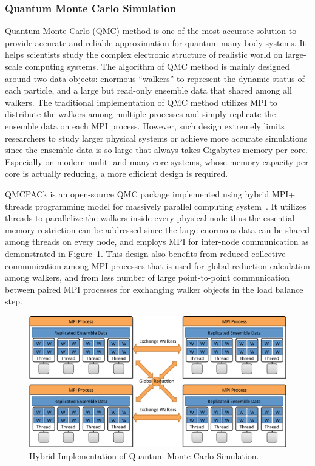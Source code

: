 \subsubsection{Quantum Monte Carlo Simulation}
Quantum Monte Carlo (QMC) method is one of the most accurate solution to
provide accurate and reliable approximation for quantum many-body systems.
It helps scientists study the complex electronic structure of realistic
world on large-scale computing systems. The algorithm of QMC method is
mainly designed around two data objects: enormous ``walkers'' to represent
the dynamic status of each particle, and a large but read-only ensemble
data that shared among all walkers. The traditional implementation of
QMC method utilizes MPI to distribute the walkers among multiple processes
and simply replicate the ensemble data on each MPI process. However,
such design extremely limits researchers to study larger physical systems
or achieve more accurate simulations since the ensemble data is so large
that always takes Gigabytes memory per core. Especially on modern
mulit- and many-core systems, whose memory capacity per core is actually
reducing, a more efficient design is required.

QMCPACk is an open-source QMC package implemented using hybrid MPI+
threads programming model for massively parallel computing system~\cite{qmcpack}.
It utilizes threads to parallelize the walkers inside every physical node
thus the essential memory restriction can be addressed since the large
enormous data can be shared among threads on every node, and employs MPI
for inter-node communication as demonstrated in Figure~\ref{fig:app-qmcpack}.
This design also benefits from reduced collective communication among
MPI processes that is used for global reduction calculation among walkers,
and from less number of large point-to-point communication between paired
MPI processes for exchanging walker objects in the load balance step.

\begin{figure}[ht]
\centering
\includegraphics[width=1\textwidth]{figures/background/app-qmcpack.pdf}
\caption{Hybrid Implementation of Quantum Monte Carlo Simulation.}
\label{fig:app-qmcpack}
\end{figure}

